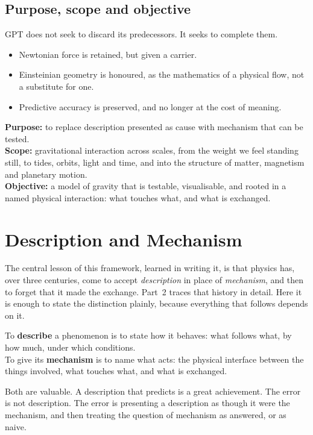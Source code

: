 \documentclass[11pt,a4paper]{article}
\begin{document}
\subsection*{Purpose, scope and objective}

GPT does not seek to discard its predecessors. It seeks to complete them.
\begin{itemize}
  \item Newtonian force is retained, but given a carrier.
  \item Einsteinian geometry is honoured, as the mathematics of a physical flow, not a substitute for one.
  \item Predictive accuracy is preserved, and no longer at the cost of meaning.
\end{itemize}

\textbf{Purpose:} to replace description presented as cause with mechanism that can be tested.\\
\textbf{Scope:} gravitational interaction across scales, from the weight we feel standing still, to tides, orbits, light and time, and into the structure of matter, magnetism and planetary motion.\\
\textbf{Objective:} a model of gravity that is testable, visualisable, and rooted in a named physical interaction: what touches what, and what is exchanged.

\section{Description and Mechanism}

The central lesson of this framework, learned in writing it, is that physics has, over three centuries, come to accept \emph{description} in place of \emph{mechanism}, and then to forget that it made the exchange. Part~2 traces that history in detail. Here it is enough to state the distinction plainly, because everything that follows depends on it.

To \textbf{describe} a phenomenon is to state how it behaves: what follows what, by how much, under which conditions.\\
To give its \textbf{mechanism} is to name what acts: the physical interface between the things involved, what touches what, and what is exchanged.

Both are valuable. A description that predicts is a great achievement. The error is not description. The error is presenting a description as though it were the mechanism, and then treating the question of mechanism as answered, or as naive.
\end{document}
